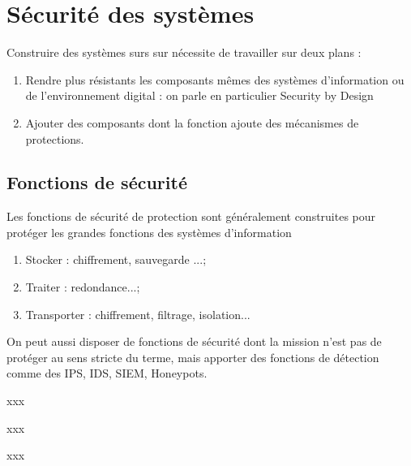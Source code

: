 
\section{Sécurité des systèmes }

Construire des systèmes surs sur nécessite  de travailler sur deux plans :

\begin{enumerate}
\item Rendre plus résistants les composants mêmes des systèmes d’information ou de l’environnement digital : on parle en particulier Security by Design
\item Ajouter des composants dont la fonction ajoute des mécanismes de protections.
\end{enumerate}

\subsection{Fonctions de sécurité}

Les fonctions de sécurité de protection sont généralement construites pour protéger les grandes fonctions des systèmes d’information
\begin{enumerate}
\item Stocker : chiffrement, sauvegarde ...;
\item Traiter : redondance...;
\item Transporter : chiffrement, filtrage, isolation...
\end{enumerate}

On peut aussi disposer de fonctions de sécurité dont la mission n’est pas de protéger au sens stricte du terme, mais apporter des fonctions de détection comme des IPS, IDS, SIEM, Honeypots. 

\begin{nota}
xxx
\end{nota}
\begin{nota}
xxx
\end{nota}
\begin{nota}
xxx
\end{nota}


